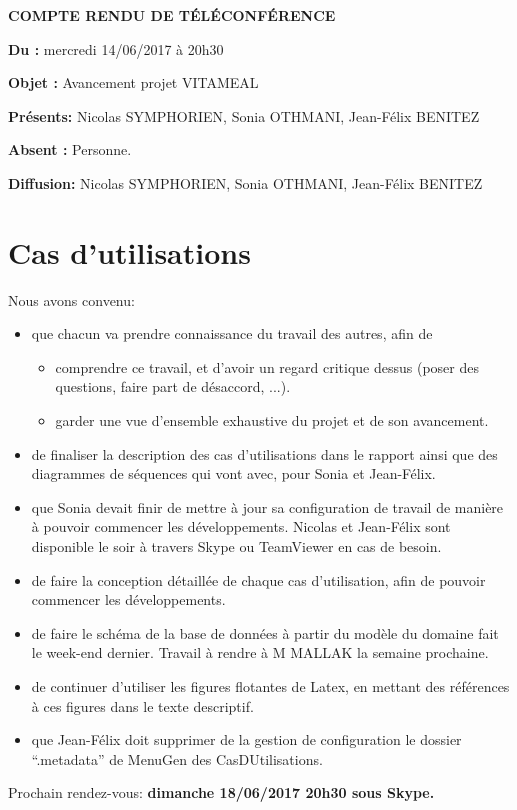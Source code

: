 \documentclass[11pt,a4paper,french,twoside,openright]{article}
\begin{document}
\pagestyle{fancy}

\begin{center}\bfseries\Huge
COMPTE RENDU DE TÉLÉCONFÉRENCE
\end{center}

\textbf{Du      :} mercredi 14/06/2017 à 20h30

\textbf{Objet   :} Avancement projet VITAMEAL

\textbf{Présents:} Nicolas SYMPHORIEN, Sonia OTHMANI, Jean-Félix BENITEZ

\textbf{Absent :} Personne.

\textbf{Diffusion:} Nicolas SYMPHORIEN, Sonia OTHMANI, Jean-Félix BENITEZ

\hrulefill

\section{Cas d'utilisations}

Nous avons convenu:
\begin{itemize}
\item que chacun va prendre connaissance du travail des autres, afin de
  \begin{itemize}
  \item comprendre ce travail, et d'avoir un regard critique dessus (poser des questions, faire part de désaccord, ...).
  \item garder une vue d'ensemble exhaustive du projet et de son avancement.
  \end{itemize}
\item de finaliser la description des cas d'utilisations dans le rapport ainsi que des diagrammes de séquences qui vont avec, pour Sonia et Jean-Félix.
\item que Sonia devait finir de mettre à jour sa configuration de travail de manière à pouvoir commencer les développements. Nicolas et Jean-Félix sont disponible le soir à travers Skype ou TeamViewer en cas de besoin.
\item de faire la conception détaillée de chaque cas d'utilisation, afin de pouvoir commencer les développements.
\item de faire le schéma de la base de données à partir du modèle du domaine fait le week-end dernier. Travail à rendre à M MALLAK la semaine prochaine.
\item de continuer d'utiliser les figures flotantes de Latex, en mettant des références à ces figures dans le texte descriptif.
\item que Jean-Félix doit supprimer de la gestion de configuration le dossier ``.metadata'' de MenuGen des CasDUtilisations.
\end{itemize}

Prochain rendez-vous: \textbf{dimanche 18/06/2017 20h30 sous Skype.}

\label{LastPage}
\end{document}
